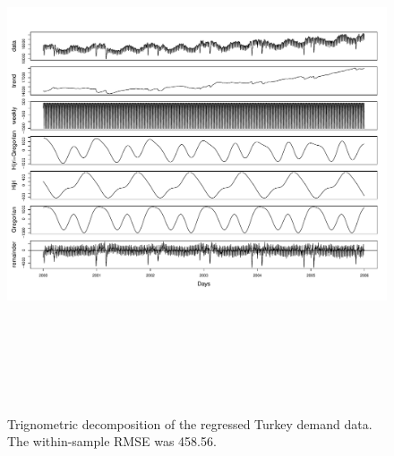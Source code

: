 \documentclass{uwstat572}
\begin{document}
\begin{figure}[]
\centering
  \includegraphics[width=\linewidth,height=6in]{tbatsDecompTelecResid.pdf}
  \caption{Trignometric decomposition of the regressed Turkey demand data. The within-sample RMSE was 458.56.}
  \label{fig:tbatsDecompTelecResid}
\end{figure}



\clearpage
\newpage

\end{document}
